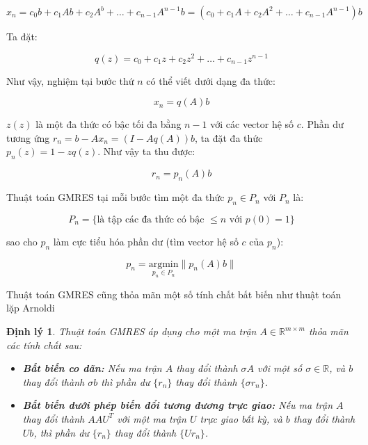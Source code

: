 \documentclass[14pt, a4paper]{article}
\numberwithin{equation}{section}
\numberwithin{algorithm}{section}
\numberwithin{figure}{section}
\newtheorem{dl}{Định lý}
\numberwithin{dl}{section}
\numberwithin{md}{section}
\numberwithin{bd}{section}
\begin{document}
\begin{equation}
    x_n = c_0 b + c_1 A b + c_2 A^b + \dots + c_{n-1}A^{n-1}b=(c_0 + c_1 A + c_2 A^2 + \dots + c_{n-1} A^{n-1})b
\end{equation}

Ta đặt:

\begin{equation}
    q(z) = c_0 + c_1 z + c_2 z^2 + \dots + c_{n-1}z^{n-1}
\end{equation}

Như vậy, nghiệm tại bước thứ $n$ có thể viết dưới dạng đa thức:

\begin{equation}
    x_n = q(A)b
\end{equation}

$z(z)$ là một đa thức có bậc tối đa bằng $n-1$ với các vector hệ số $c$. Phần dư tương ứng $r_n=b - Ax_n=(I - Aq(A))b$, ta đặt đa thức $p_n(z) = 1 - z q(z)$. Như vậy ta thu được:

\begin{equation} \label{eq:Polynomial-Approximation}
    r_n = p_n(A)b
\end{equation}

Thuật toán GMRES tại mỗi bước tìm một đa thức $p_n \in P_n$ với $P_n$ là:

\begin{equation}
    P_n = \lbrace \text{là tập các đa thức có bậc } \leq n \text{ với } p(0)=1 \rbrace
\end{equation}

sao cho $p_n$ làm cực tiểu hóa phần dư (tìm vector hệ số $c$ của $p_n$):

\begin{equation} \label{eq:Find-Polynomial}
    p_n = \underset{p_n \in P_n}{\mathrm{argmin}} \lVert p_n(A)b \rVert
\end{equation}

Thuật toán GMRES cũng thỏa mãn một số tính chất bất biến như thuật toán lặp Arnoldi

\begin{dl}
    Thuật toán GMRES áp dụng cho một ma trận $A \in \mathbb{R}^{m \times m}$ thỏa mãn các tính chất sau:

    \begin{itemize}
        \item \textbf{Bất biến co dãn:} Nếu ma trận $A$ thay đổi thành $\sigma A$ với một số $\sigma \in \mathbb{R}$, và $b$ thay đổi thành $\sigma b$ thì phần dư $\lbrace r_n \rbrace$ thay đổi thành $\lbrace \sigma r_n \rbrace$.
        \item \textbf{Bất biến dưới phép biến đổi tương đương trực giao:} Nếu ma trận $A$ thay đổi thành $A A U^T$ với một ma trận $U$ trực giao bất kỳ, và $b$ thay đổi thành $Ub$, thì phần dư $\lbrace r_n \rbrace$ thay đổi thành $\lbrace U r_n \rbrace$.
    \end{itemize}
\end{dl}
\end{document}
